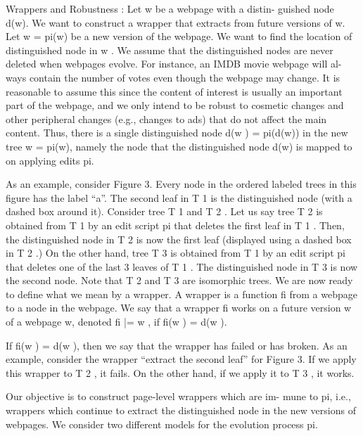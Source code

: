 Wrappers and Robustness : Let w be a webpage with a distin-
guished node d(w). We want to construct a wrapper that extracts
from future versions of w. Let w = pi(w) be a new version of the
webpage. We want to find the location of distinguished node in w .
We assume that the distinguished nodes are never deleted when
webpages evolve. For instance, an IMDB movie webpage will al-
ways contain the number of votes even though the webpage may
change. It is reasonable to assume this since the content of interest
is usually an important part of the webpage, and we only intend to
be robust to cosmetic changes and other peripheral changes (e.g.,
changes to ads) that do not affect the main content. Thus, there
is a single distinguished node d(w ) = pi(d(w)) in the new tree
w = pi(w), namely the node that the distinguished node d(w) is
mapped to on applying edits pi.

As an example, consider Figure 3. Every node in the ordered
labeled trees in this figure has the label “a”. The second leaf in T 1 is
the distinguished node (with a dashed box around it). Consider tree
T 1 and T 2 . Let us say tree T 2 is obtained from T 1 by an edit script
pi that deletes the first leaf in T 1 . Then, the distinguished node in
T 2 is now the first leaf (displayed using a dashed box in T 2 .) On
the other hand, tree T 3 is obtained from T 1 by an edit script pi that
deletes one of the last 3 leaves of T 1 . The distinguished node in T 3
is now the second node. Note that T 2 and T 3 are isomorphic trees.
We are now ready to define what we mean by a wrapper.
A wrapper is a function fi from a webpage to a node in the
webpage. We say that a wrapper fi works on a future version
w of a webpage w, denoted fi |= w , if fi(w ) = d(w ).

If fi(w ) = d(w ), then we say that the wrapper has failed or has
broken. As an example, consider the wrapper “extract the second
leaf” for Figure 3. If we apply this wrapper to T 2 , it fails. On the
other hand, if we apply it to T 3 , it works.

Our objective is to construct page-level wrappers which are im-
mune to pi, i.e., wrappers which continue to extract the distinguished
node in the new versions of webpages. We consider two different
models for the evolution process pi.

